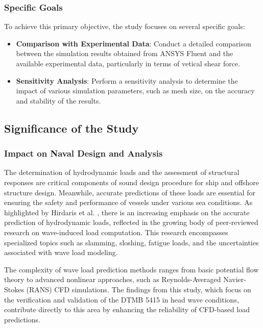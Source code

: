 \documentclass[12pt]{article} %
\begin{document}
\subsubsection{Specific Goals}
To achieve this primary objective, the study focuses on several specific goals:
\begin{itemize}
    \item \textbf{Comparison with Experimental Data}: Conduct a detailed comparison between the 
    simulation results obtained from ANSYS Fluent and the available experimental data, particularly 
    in terms of vetical shear force.
    \item \textbf{Sensitivity Analysis}: Perform a sensitivity analysis to determine the impact 
    of various simulation parameters, such as mesh size, on the accuracy and stability of the results.
\end{itemize}

\subsection{Significance of the Study}
\subsubsection{Impact on Naval Design and Analysis}
The determination of hydrodynamic loads and the assessment of structural responses are critical 
components of sound design procedure for ship and offshore structure design\cite{offshorehydrodynamics}. Meanwhile, accurate predictions of these 
loads are essential for ensuring the safety and performance of vessels under various sea conditions. 
As highlighted by Hirdaris et al. \cite{Hirdaris2014}, there is an increasing emphasis on the accurate 
prediction of hydrodynamic loads, reflected in the growing body of peer-reviewed research on wave-induced 
load computation. This research encompasses specialized topics such as slamming, sloshing, fatigue loads, 
and the uncertainties associated with wave load modeling.

The complexity of wave load prediction methods ranges from basic potential flow theory to advanced 
nonlinear approaches, such as Reynolds-Averaged Navier-Stokes (RANS) CFD simulations. The findings 
from this study, which focus on the verification and validation of the DTMB 5415 in head wave conditions, 
contribute directly to this area by enhancing the reliability of CFD-based load predictions.
\end{document}
